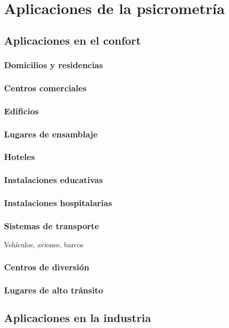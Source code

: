 \section{Aplicaciones de la psicrometría}
    \subsection{Aplicaciones en el confort}
        \subsubsection{Domicilios y residencias}
        \subsubsection{Centros comerciales}
        \subsubsection{Edificios}
        \subsubsection{Lugares de ensamblaje}
        \subsubsection{Hoteles}
        \subsubsection{Instalaciones educativas}
        \subsubsection{Instalaciones hospitalarias}
        \subsubsection{Sistemas de transporte}
            Vehículos, aviones, barcos
        \subsubsection{Centros de diversión}
        \subsubsection{Lugares de alto tránsito}

        \subsection{Aplicaciones en la industria}
